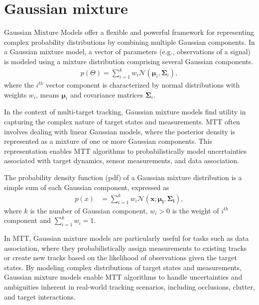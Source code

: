     \section{Gaussian mixture}
Gaussian Mixture Models offer a flexible and powerful framework for representing complex probability distributions by combining multiple Gaussian components. In a Gaussian mixture model, a vector of parameters (e.g., observations of a signal) is modeled using a mixture distribution comprising several Gaussian components.
    \begin{align}
        p(\Theta) = \sum_{i=1}^k w_i \mathcal{N}(\mathbf{\mu}_i, \mathbf{\Sigma}_i),
    \end{align}
where the $i^{th}$ vector component is characterized by normal distributions with weights $w_i$, means $\mathbf{\mu}_i$ and covariance matrices $\mathbf{\Sigma}_i$.

In the context of multi-target tracking, Gaussian mixture models find utility in capturing the complex nature of target states and measurements. MTT often involves dealing with linear Gaussian models, where the posterior density is represented as a mixture of one or more Gaussian components. This representation enables MTT algorithms to probabilistically model uncertainties associated with target dynamics, sensor measurements, and data association.

The probability density function (pdf) of a Gaussian mixture distribution is a simple sum of each Gaussian component, expressed as
    \begin{align}
        p(x) &= \sum_{i=1}^k w_i\mathcal{N}(\mathbf{x};\mathbf{\mu_i}, \mathbf{\Sigma_i}),
    \end{align}
where $k$ is the number of Gaussian component, $w_i>0$ is the weight of $i^{th}$ component and $\sum_{i=1}^k w_i = 1$.

In MTT, Gaussian mixture models are particularly useful for tasks such as data association, where they probabilistically assign measurements to existing tracks or create new tracks based on the likelihood of observations given the target states. By modeling complex distributions of target states and measurements, Gaussian mixture models enable MTT algorithms to handle uncertainties and ambiguities inherent in real-world tracking scenarios, including occlusions, clutter, and target interactions.

